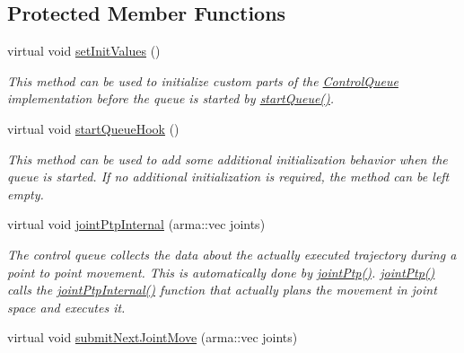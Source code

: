 \subsection*{Protected Member Functions}
\begin{DoxyCompactItemize}
\item 
virtual void \hyperlink{classkukadu_1_1KukieControlQueue_ab828e3291b59e05855efd323a0124ac4}{set\+Init\+Values} ()\hypertarget{classkukadu_1_1KukieControlQueue_ab828e3291b59e05855efd323a0124ac4}{}\label{classkukadu_1_1KukieControlQueue_ab828e3291b59e05855efd323a0124ac4}

\begin{DoxyCompactList}\small\item\em This method can be used to initialize custom parts of the \hyperlink{classkukadu_1_1ControlQueue}{Control\+Queue} implementation before the queue is started by \hyperlink{classkukadu_1_1ControlQueue_a35d6a6e4e7c8467691c11567fe21f340}{start\+Queue()}. \end{DoxyCompactList}\item 
virtual void \hyperlink{classkukadu_1_1KukieControlQueue_ab86936efc30e3b3584fdaf98ef006540}{start\+Queue\+Hook} ()\hypertarget{classkukadu_1_1KukieControlQueue_ab86936efc30e3b3584fdaf98ef006540}{}\label{classkukadu_1_1KukieControlQueue_ab86936efc30e3b3584fdaf98ef006540}

\begin{DoxyCompactList}\small\item\em This method can be used to add some additional initialization behavior when the queue is started. If no additional initialization is required, the method can be left empty. \end{DoxyCompactList}\item 
virtual void \hyperlink{classkukadu_1_1KukieControlQueue_a73687ba516b2cfb5f9124ae9f165fc57}{joint\+Ptp\+Internal} (arma\+::vec joints)\hypertarget{classkukadu_1_1KukieControlQueue_a73687ba516b2cfb5f9124ae9f165fc57}{}\label{classkukadu_1_1KukieControlQueue_a73687ba516b2cfb5f9124ae9f165fc57}

\begin{DoxyCompactList}\small\item\em The control queue collects the data about the actually executed trajectory during a point to point movement. This is automatically done by \hyperlink{classkukadu_1_1ControlQueue_ad11059100321b24a1af8ef7de8314353}{joint\+Ptp()}. \hyperlink{classkukadu_1_1ControlQueue_ad11059100321b24a1af8ef7de8314353}{joint\+Ptp()} calls the \hyperlink{classkukadu_1_1KukieControlQueue_a73687ba516b2cfb5f9124ae9f165fc57}{joint\+Ptp\+Internal()} function that actually plans the movement in joint space and executes it. \end{DoxyCompactList}\item 
virtual void \hyperlink{classkukadu_1_1KukieControlQueue_a801f4d00e4eed9c11a53cb1521db42f0}{submit\+Next\+Joint\+Move} (arma\+::vec joints)\hypertarget{classkukadu_1_1KukieControlQueue_a801f4d00e4eed9c11a53cb1521db42f0}{}\label{classkukadu_1_1KukieControlQueue_a801f4d00e4eed9c11a53cb1521db42f0}


\end{DoxyCompactItemize}
